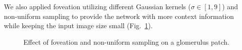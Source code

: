 \documentclass{elsarticle}
\begin{document}
We also applied foveation \citep{NIPS2012_4741} utilizing different Gaussian kernels ($\sigma \in [1, 9]$) and non-uniform sampling to provide the network with more context information while keeping the input image size small (Fig.~\ref{foveationAndNonUniformSampling}).

\begin{figure}[bt]
	\centering
		 \hspace{0.01cm} %
		\hspace{0.01cm} %
		 \hspace{0.01cm}
	\caption{Effect of foveation and non-uniform sampling on a glomerulus patch.}
	\label{foveationAndNonUniformSampling}
\end{figure}
\end{document}
